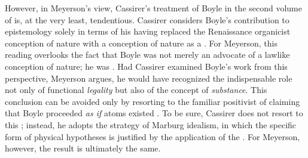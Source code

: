 \documentclass[submitted,12pt]{article}
\begin{document}
However, in Meyerson's view, Cassirer's treatment of Boyle in the second volume of \EPt is, at the very least, tendentious. Cassirer considers Boyle's contribution to epistemology solely in terms of his having replaced the Renaissance organicist conception of nature with a conception of nature as a  \citep[312--313]{Cassirer1907b}. For Meyerson, this reading overlooks the fact that Boyle was not merely an advocate of a lawlike conception of nature; he was  \citep[122--123]{Meyerson1911}. Had Cassirer examined Boyle's work from this perspective, Meyerson argues, he would have recognized the indispensable role not only of functional \emph{legality} but also of the concept of \emph{substance}. This conclusion can be avoided only by resorting to the familiar positivist  of claiming that Boyle proceeded \textit{as if} atoms existed \citep[123]{Meyerson1911}. To be sure, Cassirer does not resort to this ; instead, he adopts the strategy of Marburg idealism, in which the specific form of physical hypotheses is justified by the application of the  \citep[123]{Meyerson1911}. For Meyerson, however, the result is ultimately the same.
\end{document}
